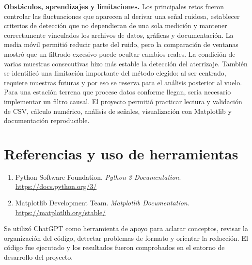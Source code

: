 \documentclass[9pt,a4paper]{extarticle}
\begin{document}
\textbf{Obstáculos, aprendizajes y limitaciones.} Los principales retos fueron controlar las fluctuaciones que aparecen al derivar una señal ruidosa, establecer criterios de detección que no dependieran de una sola medición y mantener correctamente vinculados los archivos de datos, gráficas y documentación. La media móvil permitió reducir parte del ruido, pero la comparación de ventanas mostró que un filtrado excesivo puede ocultar cambios reales. La condición de varias muestras consecutivas hizo más estable la detección del aterrizaje. También se identificó una limitación importante del método elegido: al ser centrado, requiere muestras futuras y por eso se reserva para el análisis posterior al vuelo. Para una estación terrena que procese datos conforme llegan, sería necesario implementar un filtro causal. El proyecto permitió practicar lectura y validación de CSV, cálculo numérico, análisis de señales, visualización con Matplotlib y documentación reproducible.

\section{Referencias y uso de herramientas}

\begin{enumerate}[leftmargin=*,nosep]
\item Python Software Foundation. \textit{Python 3 Documentation}. \url{https://docs.python.org/3/}
\item Matplotlib Development Team. \textit{Matplotlib Documentation}. \url{https://matplotlib.org/stable/}
\end{enumerate}

Se utilizó ChatGPT como herramienta de apoyo para aclarar conceptos, revisar la organización del código, detectar problemas de formato y orientar la redacción. El código fue ejecutado y los resultados fueron comprobados en el entorno de desarrollo del proyecto.
\end{document}
